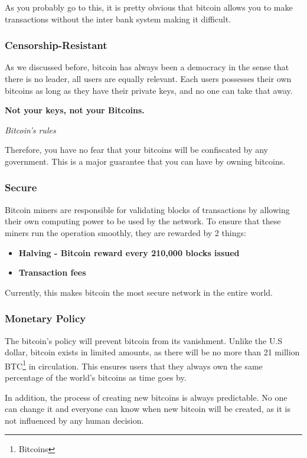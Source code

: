 \documentclass{article}
\newcommand\tab[1][1cm]{\hspace*{#1}}
\begin{document}
As you probably go to this, it is pretty obvious that bitcoin allows you to make transactions without the inter bank system making it difficult.

\subsubsection{Censorship-Resistant}

\tab As we discussed before, bitcoin has always been a democracy in the sense that there is no leader, all users are equally relevant. Each users possesses their own bitcoins as long as they have their private keys, and no one can take that away. 

\renewcommand{\epigraphflush}{center}
\epigraph{\textbf{Not your keys, not your Bitcoins.}}{\textit{Bitcoin's rules}}

Therefore, you have no fear that your bitcoins will be confiscated by any government. This is a major guarantee that you can have by owning bitcoins.

\subsubsection{Secure}

\tab Bitcoin miners are responsible for validating blocks of transactions by allowing their own computing power to be used by the network. To ensure that these miners run the operation smoothly, they are rewarded by 2 things:

\begin{itemize}
    \item \textbf{Halving - Bitcoin reward every 210,000 blocks issued}
    \item \textbf{Transaction fees}
\end{itemize}

 Currently, this makes bitcoin the most secure network in the entire world. 
 
\subsubsection{Monetary Policy}

\tab The bitcoin's policy will prevent bitcoin from its vanishment. Unlike the U.S dollar, bitcoin exists in limited amounts, as there will be no more than 21 million BTC\footnote{Bitcoins} in circulation. This ensures users that they always own the same percentage of the world's bitcoins as time goes by.

In addition, the process of creating new bitcoins is always predictable. No one can change it and everyone can know when new bitcoin will be created, as it is not influenced by any human decision. 
\end{document}
